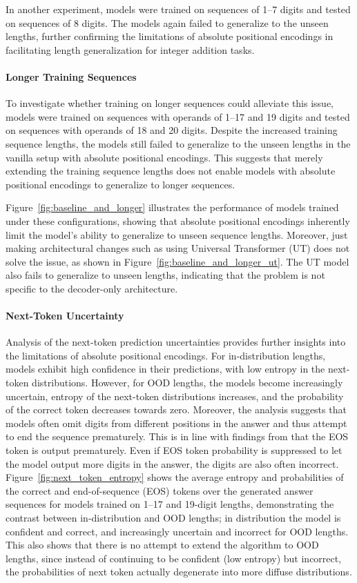 In another experiment, models were trained on sequences of 1--7 digits and tested on sequences of 8 digits. The models again failed to generalize to the unseen lengths, further confirming the limitations of absolute positional encodings in facilitating length generalization for integer addition tasks.

\paragraph{Longer Training Sequences}
To investigate whether training on longer sequences could alleviate this issue, models were trained on sequences with operands of 1--17 and 19 digits and tested on sequences with operands of 18 and 20 digits. Despite the increased training sequence lengths, the models still failed to generalize to the unseen lengths in the vanilla setup with absolute positional encodings. This suggests that merely extending the training sequence lengths does not enable models with absolute positional encodings to generalize to longer sequences.

Figure~\ref{fig:baseline_and_longer} illustrates the performance of models trained under these configurations, showing that absolute positional encodings inherently limit the model's ability to generalize to unseen sequence lengths. Moreover, just making architectural changes such as using Universal Transformer (UT) does not solve the issue, as shown in Figure~\ref{fig:baseline_and_longer_ut}. The UT model also fails to generalize to unseen lengths, indicating that the problem is not specific to the decoder-only architecture.

\paragraph{Next-Token Uncertainty}
Analysis of the next-token prediction uncertainties provides further insights into the limitations of absolute positional encodings. For in-distribution lengths, models exhibit high confidence in their predictions, with low entropy in the next-token distributions. However, for OOD lengths, the models become increasingly uncertain, entropy of the next-token distributions increases, and the probability of the correct token decreases towards zero. Moreover, the analysis suggests that models often omit digits from different positions in the answer and thus attempt to end the sequence prematurely. This is in line with findings from \cite{newman_eos_2020} that the EOS token is output prematurely. Even if EOS token probability is suppressed to let the model output more digits in the answer, the digits are also often incorrect. Figure~\ref{fig:next_token_entropy} shows the average entropy and probabilities of the correct and end-of-sequence (EOS) tokens over the generated answer sequences for models trained on 1--17 and 19-digit lengths, demonstrating the contrast between in-distribution and OOD lengths; in distribution the model is confident and correct, and increasingly uncertain and incorrect for OOD lengths. This also shows that there is no attempt to extend the algorithm to OOD lengths, since instead of continuing to be confident (low entropy) but incorrect, the probabilities of next token actually degenerate into more diffuse distributions.

